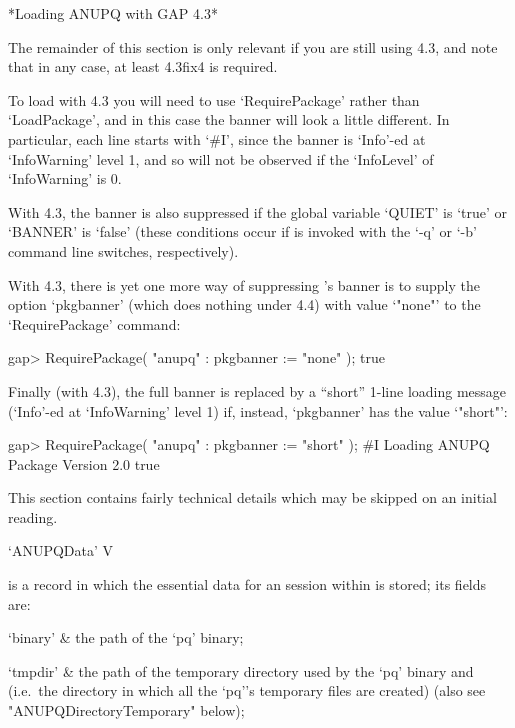 *Loading ANUPQ with GAP 4.3*

The remainder of this section is only relevant if  you  are  still  using
{\GAP} 4.3, and note that  in  any  case,  at  least  {\GAP}  4.3fix4  is
required.

To load {\ANUPQ} with {\GAP} 4.3 you will need  to  use  `RequirePackage'
rather than `LoadPackage', and in this case the banner will look a little
different. In particular, each line starts with `\#I', since  the  banner
is `Info'-ed at `InfoWarning' level 1, and so will not be observed if the
`InfoLevel' of `InfoWarning' is 0.

With {\GAP} 4.3, the banner is  also  suppressed  if  the  global  {\GAP}
variable `QUIET' is `true' or `BANNER' is `false' (these conditions occur
if {\GAP} is invoked  with  the  `-q'  or  `-b'  command  line  switches,
respectively).

With {\GAP} 4.3, there is yet one  more  way  of  suppressing  {\ANUPQ}'s
banner is to supply the option  `pkgbanner'  (which  does  nothing  under
{\GAP} 4.4) with value `"none"' to the `RequirePackage' command:

\beginexample
gap> RequirePackage( "anupq" : pkgbanner := "none" );
true
\endexample

Finally (with {\GAP} 4.3), the full banner is  replaced  by  a  ``short''
1-line loading message (`Info'-ed at `InfoWarning' level 1) if,  instead,
`pkgbanner' has the value `"short"':

\begintt
gap> RequirePackage( "anupq" : pkgbanner := "short" );
#I  Loading ANUPQ Package Version 2.0
true
\endtt


This section contains fairly technical details which may be skipped on an
initial reading.

\>`ANUPQData' V

is a {\GAP} record in which the essential data for  an  {\ANUPQ}  session
within {\GAP} is stored; its fields are:

\beginitems

\quad`binary' & the path of the `pq' binary;

\quad`tmpdir' & the path of the temporary  directory  used  by  the  `pq'
binary and {\GAP} (i.e.~the directory in which all the  `pq''s  temporary
files are created) (also see "ANUPQDirectoryTemporary" below);

